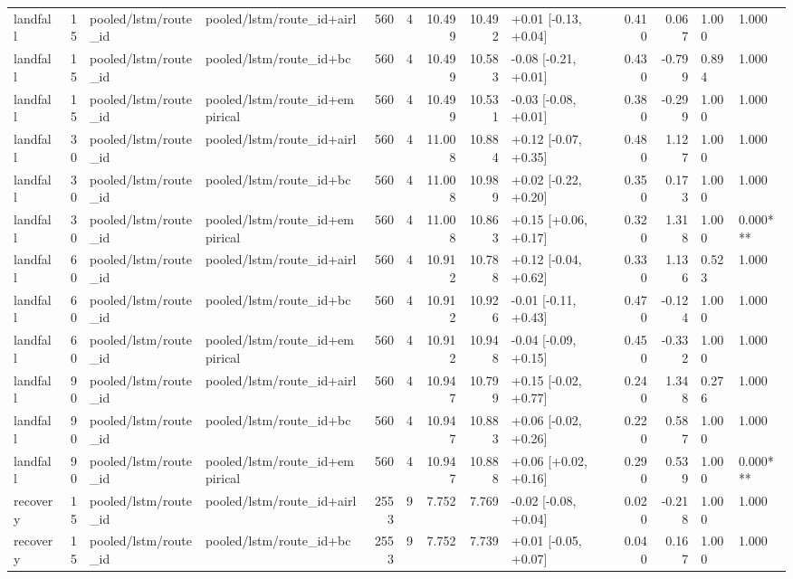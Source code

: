 \begin{tabular}{lrllrrrrlrrll}
landfall & 15 & pooled/lstm/route_id & pooled/lstm/route_id+airl & 560 & 4 & 10.499 & 10.492 & +0.01 [-0.13, +0.04] & 0.410 & 0.067 & 1.000 & 1.000 \\
landfall & 15 & pooled/lstm/route_id & pooled/lstm/route_id+bc & 560 & 4 & 10.499 & 10.583 & -0.08 [-0.21, +0.01] & 0.430 & -0.799 & 0.894 & 1.000 \\
landfall & 15 & pooled/lstm/route_id & pooled/lstm/route_id+empirical & 560 & 4 & 10.499 & 10.531 & -0.03 [-0.08, +0.01] & 0.380 & -0.299 & 1.000 & 1.000 \\
landfall & 30 & pooled/lstm/route_id & pooled/lstm/route_id+airl & 560 & 4 & 11.008 & 10.884 & +0.12 [-0.07, +0.35] & 0.480 & 1.127 & 1.000 & 1.000 \\
landfall & 30 & pooled/lstm/route_id & pooled/lstm/route_id+bc & 560 & 4 & 11.008 & 10.989 & +0.02 [-0.22, +0.20] & 0.350 & 0.173 & 1.000 & 1.000 \\
landfall & 30 & pooled/lstm/route_id & pooled/lstm/route_id+empirical & 560 & 4 & 11.008 & 10.863 & +0.15 [+0.06, +0.17] & 0.320 & 1.318 & 1.000 & 0.000*** \\
landfall & 60 & pooled/lstm/route_id & pooled/lstm/route_id+airl & 560 & 4 & 10.912 & 10.788 & +0.12 [-0.04, +0.62] & 0.330 & 1.136 & 0.523 & 1.000 \\
landfall & 60 & pooled/lstm/route_id & pooled/lstm/route_id+bc & 560 & 4 & 10.912 & 10.926 & -0.01 [-0.11, +0.43] & 0.470 & -0.124 & 1.000 & 1.000 \\
landfall & 60 & pooled/lstm/route_id & pooled/lstm/route_id+empirical & 560 & 4 & 10.912 & 10.948 & -0.04 [-0.09, +0.15] & 0.450 & -0.332 & 1.000 & 1.000 \\
landfall & 90 & pooled/lstm/route_id & pooled/lstm/route_id+airl & 560 & 4 & 10.947 & 10.799 & +0.15 [-0.02, +0.77] & 0.240 & 1.348 & 0.276 & 1.000 \\
landfall & 90 & pooled/lstm/route_id & pooled/lstm/route_id+bc & 560 & 4 & 10.947 & 10.883 & +0.06 [-0.02, +0.26] & 0.220 & 0.587 & 1.000 & 1.000 \\
landfall & 90 & pooled/lstm/route_id & pooled/lstm/route_id+empirical & 560 & 4 & 10.947 & 10.888 & +0.06 [+0.02, +0.16] & 0.290 & 0.539 & 1.000 & 0.000*** \\
recovery & 15 & pooled/lstm/route_id & pooled/lstm/route_id+airl & 2553 & 9 & 7.752 & 7.769 & -0.02 [-0.08, +0.04] & 0.020 & -0.218 & 1.000 & 1.000 \\
recovery & 15 & pooled/lstm/route_id & pooled/lstm/route_id+bc & 2553 & 9 & 7.752 & 7.739 & +0.01 [-0.05, +0.07] & 0.040 & 0.167 & 1.000 & 1.000 \\

\end{tabular}
